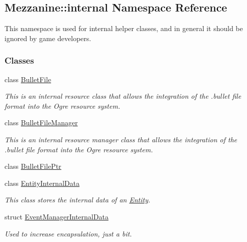\hypertarget{namespaceMezzanine_1_1internal}{
\subsection{Mezzanine::internal Namespace Reference}
\label{namespaceMezzanine_1_1internal}
}


This namespace is used for internal helper classes, and in general it should be ignored by game developers.  


\subsubsection*{Classes}
\begin{DoxyCompactItemize}
\item 
class \hyperlink{classMezzanine_1_1internal_1_1BulletFile}{BulletFile}
\begin{DoxyCompactList}\small\item\em This is an internal resource class that allows the integration of the .bullet file format into the Ogre resource system. \item\end{DoxyCompactList}\item 
class \hyperlink{classMezzanine_1_1internal_1_1BulletFileManager}{BulletFileManager}
\begin{DoxyCompactList}\small\item\em This is an internal resource manager class that allows the integration of the .bullet file format into the Ogre resource system. \item\end{DoxyCompactList}\item 
class \hyperlink{classMezzanine_1_1internal_1_1BulletFilePtr}{BulletFilePtr}
\item 
class \hyperlink{structMezzanine_1_1internal_1_1EntityInternalData}{EntityInternalData}
\begin{DoxyCompactList}\small\item\em This class stores the internal data of an \hyperlink{classMezzanine_1_1Entity}{Entity}. \item\end{DoxyCompactList}\item 
struct \hyperlink{structMezzanine_1_1internal_1_1EventManagerInternalData}{EventManagerInternalData}
\begin{DoxyCompactList}\small\item\em Used to increase encapsulation, just a bit. \item\end{DoxyCompactList}\item 

\end{DoxyCompactItemize}
